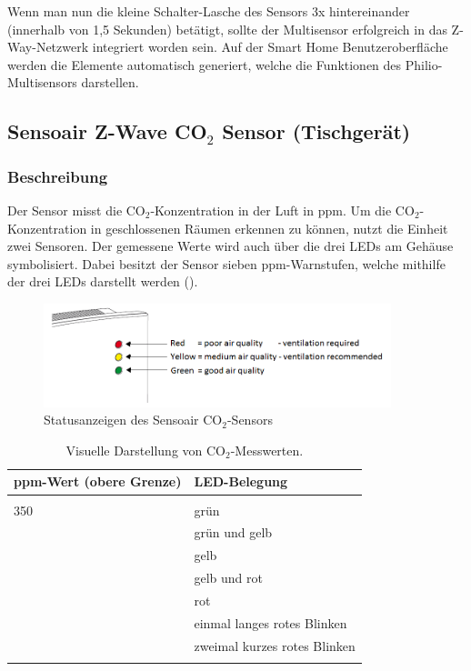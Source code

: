 Wenn man nun die kleine Schalter-Lasche des Sensors 3x hintereinander (innerhalb von 1,5 Sekunden) betätigt, sollte der Multisensor erfolgreich in das Z-Way-Netzwerk integriert worden sein. Auf der Smart Home Benutzeroberfläche werden die Elemente automatisch generiert, welche die Funktionen des Philio-Multisensors darstellen.


\subsection{Sensoair Z-Wave CO$_2$ Sensor (Tischgerät)}

\subsubsection{Beschreibung}
Der Sensor misst die CO$_2$-Konzentration in der Luft in \gls{ppm}. Um die CO$_2$-Konzentration in geschlossenen Räumen erkennen zu können, nutzt die Einheit zwei Sensoren. Der gemessene Werte wird auch über die drei LEDs am Gehäuse symbolisiert. Dabei besitzt der Sensor sieben \gls{ppm}-Warnstufen, welche mithilfe der drei LEDs darstellt werden ().

\begin{figure}[h!]
	\centering
	\includegraphics[width=0.9\textwidth]{img/Sensorevaluation/Sensoair.png}
	\caption{Statusanzeigen des Sensoair CO$_2$-Sensors}
	\label{fig:sensorenSensoair}
\end{figure}


\begin{longtabu} to 
	\hline
	\textbf{ppm-Wert (obere Grenze)}	& \textbf{LED-Belegung} \\
	\hline
	\endhead
	  \\ 
	\endfoot
	\endlastfoot
	350									& grün \\ 
										& grün und gelb \\
										& gelb \\
									& gelb und rot \\
									& rot \\
									& einmal langes rotes Blinken \\
									& zweimal kurzes rotes Blinken \\
	\hline
	\caption{Visuelle Darstellung von CO$_2$-Messwerten.}
\end{longtabu}

